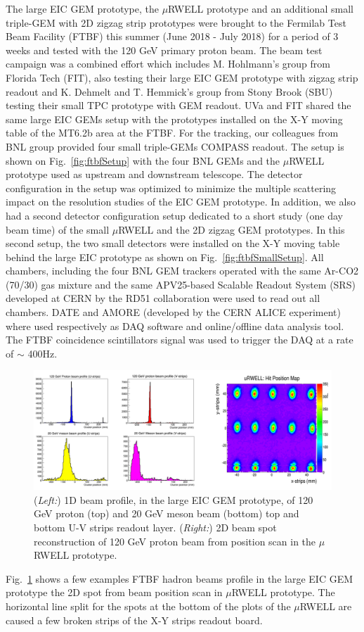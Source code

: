 %
The large EIC GEM prototype, the $\mu$RWELL prototype  and an additional small triple-GEM with 2D zigzag strip prototypes were brought to the Fermilab Test Beam Facility (FTBF) this summer (June 2018 - July 2018) for a period of 3 weeks and tested with the 120 GeV primary proton beam. The beam test campaign was a combined effort which includes M. Hohlmann's group  from Florida Tech (FIT), also testing  their large EIC GEM prototype with zigzag strip readout and K. Dehmelt and T. Hemmick's group from Stony Brook (SBU) testing their small TPC prototype with GEM readout. UVa and FIT shared the same large EIC GEMs setup with the prototypes installed on the X-Y moving table of the  MT6.2b area at the FTBF. For the tracking, our colleagues from BNL group provided four small triple-GEMs COMPASS readout. The setup is shown on  Fig.~\ref{fig:ftbfSetup}  with the four BNL GEMs and the $\mu$RWELL prototype used as upstream and downstream telescope. The detector configuration in the setup  was optimized to minimize the  multiple scattering impact on the resolution studies of the EIC GEM prototype. In addition, we also had a second detector configuration setup dedicated to a short study (one day beam time) of the small  $\mu$RWELL and the 2D zigzag GEM prototypes. In this second setup, the two small detectors were installed on the X-Y moving table behind the large EIC prototype as shown on Fig.~\ref{fig:ftbfSmallSetup}. All chambers, including the four BNL GEM trackers operated with the same Ar-CO2 (70/30) gas mixture and the same APV25-based Scalable Readout System (SRS) developed at CERN by the RD51 collaboration were used to read out all chambers. DATE and AMORE (developed by the CERN ALICE experiment) where used respectively as DAQ software and online/offline data analysis tool. The FTBF coincidence scintillators signal was used to trigger the DAQ at a rate of $\sim$ 400Hz.\\
%
\begin{figure}[htb]
\centering
\includegraphics[width=1\columnwidth,trim={0pt 0mm 0pt 0mm},clip]{UVa_plots/ftbfBeamPosScan}
\caption{\label{fig:ftbfBeamPosScan} ({\it Left:}) 1D beam profile, in the large EIC GEM prototype, of 120 GeV proton (top) and 20 GeV meson beam (bottom) top and bottom U-V strips readout layer. ({\it Right:}) 2D beam spot reconstruction of 120 GeV proton beam from position scan in the $\mu$RWELL prototype.}
\end{figure}
%
Fig.~\ref{fig:ftbfBeamPosScan} shows a few examples FTBF hadron beams profile in the large  EIC GEM prototype the 2D spot from beam position scan in $\mu$RWELL prototype. The horizontal line split for the spots at the bottom of the plots of the $\mu$RWELL are caused a few broken strips of the X-Y strips readout board.
%
